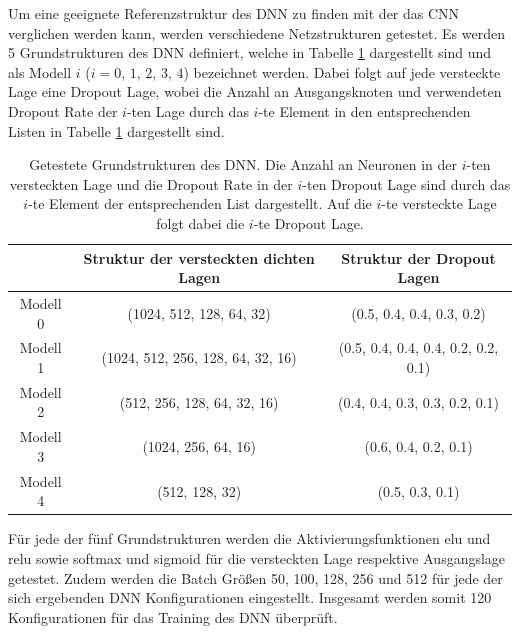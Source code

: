 Um eine geeignete Referenzstruktur des DNN zu finden mit der das CNN verglichen werden kann, werden verschiedene Netzstrukturen getestet. Es werden 5 Grundstrukturen des DNN definiert, welche in Tabelle \ref{tab:DNNstruk} dargestellt sind und als Modell $i$ ($i = 0,\,1,\,2,\,3,\,4$) bezeichnet werden. Dabei folgt auf jede versteckte Lage eine Dropout Lage, wobei die Anzahl an Ausgangsknoten und verwendeten Dropout Rate der $i$-ten Lage durch das $i$-te Element in den entsprechenden Listen in Tabelle \ref{tab:DNNstruk} dargestellt sind. \\
\captionsetup[table]{name=Tabelle}
\begin{table}[!b]
\centering
\caption{Getestete Grundstrukturen des DNN. Die Anzahl an Neuronen in der $i$-ten versteckten Lage und die Dropout Rate in der $i$-ten Dropout Lage sind durch das $i$-te Element der entsprechenden List dargestellt. Auf die $i$-te versteckte Lage folgt dabei die $i$-te Dropout Lage.}
\label{tab:DNNstruk}
 \begin{tabular}{c|c|c}
 & Struktur der versteckten dichten Lagen & Struktur der Dropout Lagen \\
 \hline
 Modell 0 & (1024, 512, 128, 64, 32) & (0.5, 0.4, 0.4, 0.3, 0.2) \\
 Modell 1 & (1024, 512, 256, 128, 64, 32, 16) & (0.5, 0.4, 0.4, 0.4, 0.2, 0.2, 0.1)\\
 Modell 2 & (512, 256, 128, 64, 32, 16) & (0.4, 0.4, 0.3, 0.3, 0.2, 0.1)\\
 Modell 3 & (1024, 256, 64, 16) & (0.6, 0.4, 0.2, 0.1)\\
 Modell 4 & (512, 128, 32) &  (0.5, 0.3, 0.1)\\
 \end{tabular}
\end{table}
Für jede der fünf Grundstrukturen werden die Aktivierungsfunktionen elu und relu sowie softmax und sigmoid für die versteckten Lage respektive Ausgangslage getestet. Zudem werden die Batch Grö{\ss}en 50, 100, 128, 256 und 512 für jede der sich ergebenden DNN Konfigurationen eingestellt. Insgesamt werden somit 120 Konfigurationen für das Training des DNN überprüft. \\
